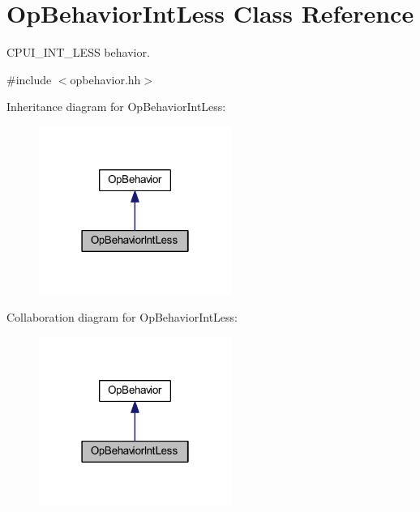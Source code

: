 \hypertarget{class_op_behavior_int_less}{}\section{Op\+Behavior\+Int\+Less Class Reference}
\label{class_op_behavior_int_less}


C\+P\+U\+I\+\_\+\+I\+N\+T\+\_\+\+L\+E\+SS behavior.  




{\ttfamily \#include $<$opbehavior.\+hh$>$}



Inheritance diagram for Op\+Behavior\+Int\+Less\+:
\nopagebreak
\begin{figure}[H]
\begin{center}
\leavevmode
\includegraphics[width=178pt]{class_op_behavior_int_less__inherit__graph}
\end{center}
\end{figure}


Collaboration diagram for Op\+Behavior\+Int\+Less\+:
\nopagebreak
\begin{figure}[H]
\begin{center}
\leavevmode
\includegraphics[width=178pt]{class_op_behavior_int_less__coll__graph}
\end{center}
\end{figure}

